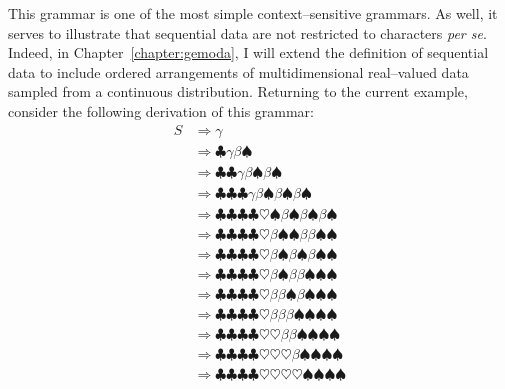 This grammar is one of the most simple context--sensitive grammars.
As well, it serves to illustrate that sequential data are not
restricted to characters \emph{per se}.  Indeed, in
Chapter~\vref{chapter:gemoda}, I will extend the definition of
sequential data to include ordered arrangements  of multidimensional
real--valued data sampled from a continuous distribution.  Returning
to the current example, consider the following derivation of this
grammar:
\begin{equation}\label{eqn:csDerivation}
    \begin{split}
    S &\Rightarrow \gamma  \\
        &\Rightarrow \clubsuit\gamma\beta\spadesuit \\
        &\Rightarrow \clubsuit\clubsuit\gamma\beta\spadesuit\beta\spadesuit \\
        &\Rightarrow \clubsuit\clubsuit\clubsuit\gamma\beta\spadesuit\beta\spadesuit\beta\spadesuit \\
        &\Rightarrow \clubsuit\clubsuit\clubsuit\clubsuit\heartsuit\spadesuit\beta\spadesuit\beta\spadesuit\beta\spadesuit \\
        &\Rightarrow \clubsuit\clubsuit\clubsuit\clubsuit\heartsuit\beta\spadesuit\spadesuit\beta\beta\spadesuit\spadesuit \\
        &\Rightarrow \clubsuit\clubsuit\clubsuit\clubsuit\heartsuit\beta\spadesuit\beta\spadesuit\beta\spadesuit\spadesuit \\
        &\Rightarrow \clubsuit\clubsuit\clubsuit\clubsuit\heartsuit\beta\spadesuit\beta\beta\spadesuit\spadesuit\spadesuit \\
        &\Rightarrow \clubsuit\clubsuit\clubsuit\clubsuit\heartsuit\beta\beta\spadesuit\beta\spadesuit\spadesuit\spadesuit \\
        &\Rightarrow \clubsuit\clubsuit\clubsuit\clubsuit\heartsuit\beta\beta\beta\spadesuit\spadesuit\spadesuit\spadesuit \\
        &\Rightarrow \clubsuit\clubsuit\clubsuit\clubsuit\heartsuit\heartsuit\beta\beta\spadesuit\spadesuit\spadesuit\spadesuit \\
        &\Rightarrow \clubsuit\clubsuit\clubsuit\clubsuit\heartsuit\heartsuit\heartsuit\beta\spadesuit\spadesuit\spadesuit\spadesuit \\
        &\Rightarrow \clubsuit\clubsuit\clubsuit\clubsuit\heartsuit\heartsuit\heartsuit\heartsuit\spadesuit\spadesuit\spadesuit\spadesuit \\
    \end{split}
\end{equation}

